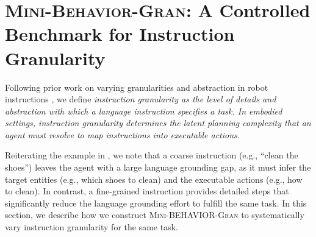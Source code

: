 \documentclass[11pt]{article}
\begin{document}
\section{\textsc{Mini-Behavior-Gran}: A Controlled Benchmark for Instruction Granularity}

Following prior work on varying granularities and abstraction in robot instructions \citep{DBLP:journals/arobots/ArumugamKGWRWT19}, we define \emph{instruction granularity as the level of details and abstraction with which a language instruction specifies a task. In embodied settings, instruction granularity determines the latent planning complexity that an agent must resolve to map instructions into executable actions.} 


Reiterating the example in , we note that a coarse instruction (e.g., ``clean the shoes'') leaves the agent with a large language grounding gap, as it must infer the target entities (e.g., which shoes to clean) and the executable actions (e.g., how to clean). In contrast, a fine-grained instruction provides detailed steps that significantly reduce the language grounding effort to fulfill the same task. In this section, we describe how we construct \textsc{Mini-BEHAVIOR-Gran} to systematically vary instruction granularity for the same task.
\end{document}
